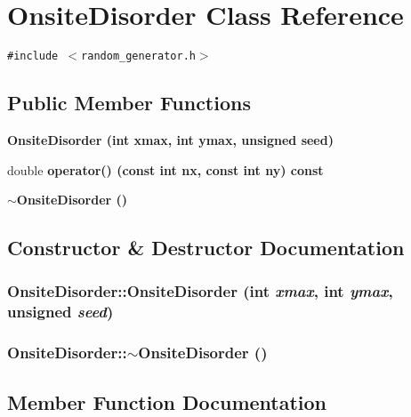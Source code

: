 \section{Onsite\-Disorder Class Reference}
\label{classOnsiteDisorder}
{\tt \#include $<$random\_\-generator.h$>$}

\subsection*{Public Member Functions}
\begin{CompactItemize}
\item 
\bf{Onsite\-Disorder} (int xmax, int ymax, unsigned seed)
\item 
double \bf{operator()} (const int nx, const int ny) const 
\item 
\bf{$\sim$Onsite\-Disorder} ()
\end{CompactItemize}


\subsection{Constructor \& Destructor Documentation}
\subsubsection{\setlength{\rightskip}{0pt plus 5cm}Onsite\-Disorder::Onsite\-Disorder (int {\em xmax}, int {\em ymax}, unsigned {\em seed})\hspace{0.3cm}{\tt  [inline]}}\label{classOnsiteDisorder_8b0bff7a4ab69ae63b7ed2d7370dd520}


\subsubsection{\setlength{\rightskip}{0pt plus 5cm}Onsite\-Disorder::$\sim$Onsite\-Disorder ()\hspace{0.3cm}{\tt  [inline]}}\label{classOnsiteDisorder_bdf1cd888b0107bc7b4002a788e78a27}




\subsection{Member Function Documentation}
